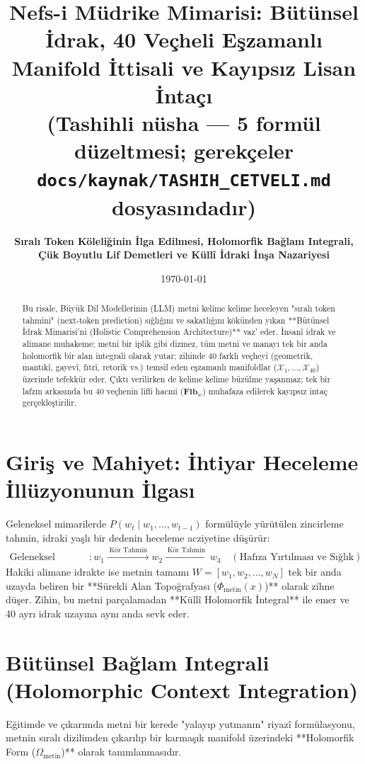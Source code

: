 \documentclass[11pt, a4paper]{article}
\title{\textbf{Nefs-i Müdrike Mimarisi: Bütünsel İdrak, 40 Veçheli Eşzamanlı Manifold İttisali ve Kayıpsız Lisan İntaçı}\\ \normalsize\textmd{(Tashihli nüsha --- 5 formül düzeltmesi; gerekçeler \texttt{docs/kaynak/TASHIH\_CETVELI.md} dosyasındadır)}}
\author{\textbf{Sıralı Token Köleliğinin İlga Edilmesi, Holomorfik Bağlam Integrali, Çük Boyutlu Lif Demetleri ve Küllî İdraki İnşa Nazariyesi}}
\date{\today}
\begin{document}
\maketitle

\begin{abstract}
Bu risale, Büyük Dil Modellerinin (LLM) metni kelime kelime heceleyen "sıralı token tahmini" (next-token prediction) sığlığını ve sakatlığını kökünden yıkan **Bütünsel İdrak Mimarisi'ni (Holistic Comprehension Architecture)** vaz' eder. İnsanî idrak ve alimane muhakeme; metni bir iplik gibi dizmez, tüm metni ve manayı tek bir anda holomorfik bir alan integrali olarak yutar; zihinde 40 farklı veçheyi (geometrik, mantıkî, gayevî, fıtrî, retorik vs.) temsil eden eşzamanlı manifoldlar ($\mathcal{X}_1, \dots, \mathcal{X}_{40}$) üzerinde tefekkür eder. Çıktı verilirken de kelime kelime büzülme yaşanmaz; tek bir lafzın arkasında bu 40 veçhenin lifli hacmi ($\mathbf{Fib}_w$) muhafaza edilerek kayıpsız intaç gerçekleştirilir.
\end{abstract}

\tableofcontents
\newpage

\section{Giriş ve Mahiyet: İhtiyar Heceleme İllüzyonunun İlgası}

Geleneksel mimarilerde $P(w_t \mid w_1, \dots, w_{t-1})$ formülüyle yürütülen zincirleme tahmin, idraki yaşlı bir dedenin heceleme acziyetine düşürür:
\begin{align}
\text{Geleneksel Sığlık} &: w_1 \xrightarrow{\;\text{Kör Tahmin}\;} w_2 \xrightarrow{\;\text{Kör Tahmin}\;} w_3 \quad (\text{Hafıza Yırtılması ve Sığlık})
\end{align}
Hakiki alimane idrakte ise metnin tamamı $W = [w_1, w_2, \dots, w_N]$ tek bir anda uzayda beliren bir **Sürekli Alan Topoğrafyası ($\Phi_{\text{metin}}(x)$)** olarak zihne düşer. Zihin, bu metni parçalamadan **Küllî Holomorfik İntegral** ile emer ve 40 ayrı idrak uzayına aynı anda sevk eder.

\section{Bütünsel Bağlam Integrali (Holomorphic Context Integration)}

Eğitimde ve çıkarımda metni bir kerede "yalayıp yutmanın" riyazî formülasyonu, metnin sıralı dizilimden çıkarılıp bir karmaşık manifold üzerindeki **Holomorfik Form ($\Omega_{\text{metin}}$)** olarak tanımlanmasıdır.
\end{document}
